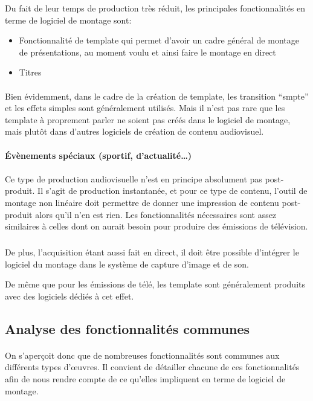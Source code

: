 Du fait de leur temps de production très réduit, les principales fonctionnalités en terme de logiciel
de montage sont:
\begin{itemize}
  \item{Fonctionnalité de template qui permet d'avoir un cadre général de montage de
    présentations, au moment voulu et ainsi faire le montage en direct}
  \item{Titres}
\end{itemize}

\paragraph{}
Bien évidemment, dans le cadre de la création de template, les transition ``smpte'' et les effets simples
sont généralement utilisés. Mais il n'est pas rare que les template à proprement parler ne soient pas créés
dans le logiciel de montage, mais plutôt dans d'autres logiciels de création de contenu audiovisuel.

\paragraph {Évènements spéciaux (sportif, d'actualité\ldots)}

\paragraph{}
Ce type de production audiovisuelle n'est en principe absolument pas post-produit. Il
s'agit de production instantanée, et pour ce type de contenu, l'outil de montage non
linéaire doit permettre de donner une impression de contenu post-produit alors
qu'il n'en est rien. Les fonctionnalités nécessaires sont assez similaires
à celles dont on aurait besoin pour produire des émissions de télévision.

\subparagraph{}
De plus, l'acquisition étant aussi fait en direct, il doit être possible
d'intégrer le logiciel du montage dans le système de capture d'image et de son.

De même que pour les émissions de télé, les template sont généralement produits avec des logiciels
dédiés à cet effet.

\subsection{Analyse des fonctionnalités communes}

\paragraph{}
On s'aperçoit donc que de nombreuses fonctionnalités sont communes aux différents
types d'œuvres. Il convient de détailler chacune de ces fonctionnalités afin de
nous rendre compte de ce qu'elles impliquent en terme de logiciel de montage.

